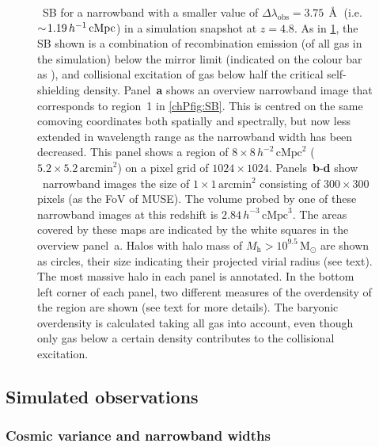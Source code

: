 \begin{figure}
    {\lya\ SB for a narrowband with a smaller value of $\Delta \lambda_\text{obs} = 3.75 \, \Angstrom$ (i.e. $\sim \! 1.19 \, h^{-1} \, \mathrm{cMpc}$) in a simulation snapshot at $z=4.8$. As in \cref{chPfig:4nsobs_ov}, the SB shown is a combination of recombination emission (of all gas in the simulation) below the mirror limit (indicated on the colour bar as ), and collisional excitation of gas below half the critical self-shielding density. Panel~\textbf{a} shows an overview narrowband image that corresponds to region~1 in \cref{chPfig:SB}. This is centred on the same comoving coordinates both spatially and spectrally, but now less extended in wavelength range as the narrowband width has been decreased. This panel shows a region of $8 \times 8 \, h^{-2} \, \mathrm{cMpc}^2$ ($5.2 \times 5.2 \, \mathrm{arcmin}^2$) on a pixel grid of $1024 \times 1024$. Panels~\textbf{b}-\textbf{d} show  \lya\ narrowband images the size of $1 \times 1 \, \mathrm{arcmin}^2$ consisting of $300 \times 300$ pixels (as the FoV of MUSE). The volume probed by one of these narrowband images at this redshift is $2.84 \, h^{-3} \, \mathrm{cMpc}^3$. The areas covered by these maps are indicated by the white squares in the overview panel~a. Halos with halo mass of $M_\mathrm{h} > 10^{9.5} \, \mathrm{M_\odot}$ are shown as circles, their size indicating their projected virial radius (see text). The most massive halo in each panel is annotated. In the bottom left corner of each panel, two different measures of the overdensity of the region are shown (see text for more details). The baryonic overdensity is calculated taking all gas into account, even though only gas below a certain density contributes to the collisional excitation.}
    \label{chPfig:4nsobs_ov}
\end{figure}

\subsection{Simulated observations}
\label{chPssec:Simulated observations}

\subsubsection{Cosmic variance and narrowband widths}
\label{chPsssec:Cosmic variance and narrowband widths}

